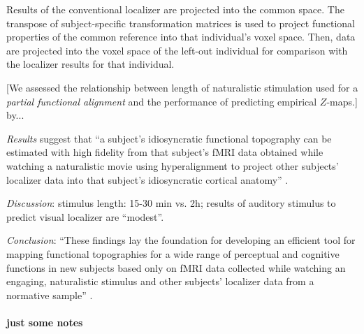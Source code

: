 %
Results of the conventional localizer are projected into the common space.
%
The transpose of subject-specific transformation matrices is used to project
functional properties of the common reference into that individual's voxel
space.
%
Then, data are projected into the voxel space of the left-out individual for
comparison with the localizer results for that individual.


[We assessed the relationship between length of naturalistic stimulation used
for a \textit{partial functional alignment} and the performance of predicting
empirical $Z$-maps.] by...

%
\textit{Results} suggest that ``a subject's idiosyncratic functional topography
can be estimated with high fidelity from that subject's fMRI data obtained while
watching a naturalistic movie using hyperalignment to project other subjects’
localizer data into that subject's idiosyncratic cortical anatomy''
\citep{jiahui2020predicting}.

%
\textit{Discussion}: stimulus length: 15-30 min vs. 2h;  results of auditory
stimulus to predict visual localizer are ``modest''.

%
\textit{Conclusion}: ``These findings lay the foundation for developing an
efficient tool for mapping functional topographies for a wide range of
perceptual and cognitive functions in new subjects based only on fMRI data
collected while watching an engaging, naturalistic stimulus and other subjects'
localizer data from a normative sample'' \citep{jiahui2020predicting}.


\paragraph{just some notes}

